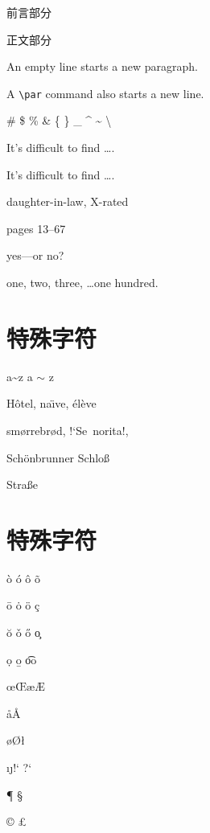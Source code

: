 \documentclass[10pt,a4paper]{book}
\begin{document}
	\Huge
	
	\tableofcontents
	
	\frontmatter
	前言部分
	
	\mainmatter
	正文部分
	
	An empty line starts a new
	paragraph.\par
	A \verb|\par| command also
	starts a new line.
	
	\# \$ \% \& \{ \} \_
	\^{} \~{}
	\textbackslash
	
	It’s difficult to find \ldots .
	
	It’s dif{}f{}icult to f{}ind \ldots .
	
	daughter-in-law, X-rated
	
	pages 13--67
	
	yes---or no?
	
	one, two, three, \ldots one hundred.
	
	\section{特殊字符}
	
	a\~{}z \qquad a $\sim$ z
	
	H\^otel, na\"\i ve, \'el\`eve
	
	sm\o rrebr\o d, !`Se\ norita!,
	
	Sch\"onbrunner Schlo\ss{}
	
	Stra\ss e
	
	\section{特殊字符}
	
	\`o \qquad \'o \qquad \^o \qquad \~o
	
	\=o \qquad \.o \qquad \"o \qquad \c c
	
	\u o \qquad \v o \qquad \H o \qquad \c o
	
	\d o \qquad \b o \qquad \t{oo}
	
	\oe \qquad \OE \qquad \ae \qquad \AE
	
	\aa \qquad \AA
	
	\o \qquad \O \qquad \l \qquad
	
	\i \qquad \j \qquad !` \qquad ?`
	
	\P{} \qquad \S{} \qquad \dag{} \qquad \ddag{}
	
	\copyright{} \qquad \pounds{}
	
	\textasteriskcentered \qquad \textperiodcentered \qquad \textbullet
	
\end{document}
